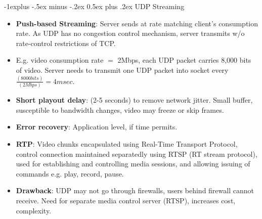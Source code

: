 \documentclass[12pt, landscape]{article}
\makeatletter
\renewcommand{\subsection}{\@startsection{subsection}{2}{0.1mm}%
                                {-1explus -.5ex minus -.2ex}%
                                {0.5ex plus .2ex}%
                                {\normalfont\normalsize\bfseries}}
\makeatother
\begin{document}
\begin{multicols*}{3}
\subsection{UDP Streaming}
\begin{itemize}
\item \textbf	{Push-based Streaming}: Server sends at rate matching client’s consumption rate. As UDP has no congestion control mechanism, server transmits w/o rate-control restrictions of TCP.
\item E.g. video consumption rate $=$ 2Mbps, each UDP packet carries 8,000 bits of video. Server needs to transmit one UDP packet into socket every $\frac{(8000 bits)}{(2 Mbps)} = 4 msec.$
\item \textbf{Short playout delay}: (2-5 seconds) to remove network jitter. Small buffer, susceptible to bandwidth changes, video may freeze or skip frames.
\item \textbf{Error recovery}: Application level, if time permits.
\item \textbf{RTP}: Video chunks encapsulated using Real-Time Transport Protocol, control connection maintained separatedly using RTSP (RT stream protocol), used for establishing and controlling media sessions, and allowing issuing of commands e.g. play, record, pause.
\item \textbf{Drawback}: UDP may not go through firewalls, users behind firewall cannot receive. Need for separate media control server (RTSP), increases cost, complexity.
\end{itemize}


\end{multicols*}
\end{document}
